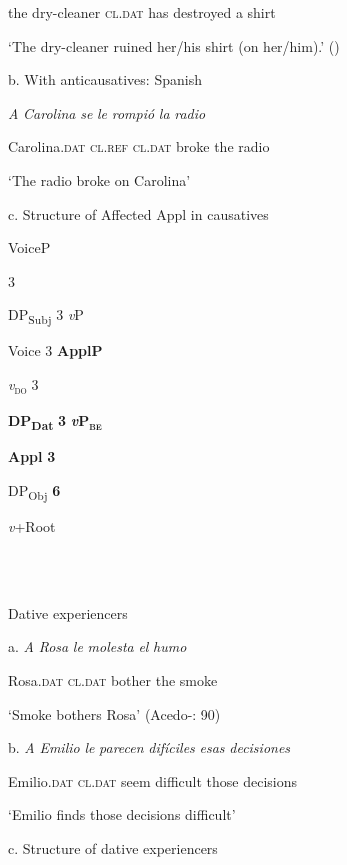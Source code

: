 \documentclass[output=paper,modfonts,nonflat]{langsci/langscibook}
\begin{document}
  the dry-cleaner \textsc{cl.dat} has destroyed a shirt

  ‘The dry-cleaner ruined her/his shirt (on her/him).’  (\citealt{BonehNash2012})    

b. With anticausatives: Spanish 

  \textit{A} \textit{Carolina}     \textit{se}         \textit{le}        \textit{rompió}   \textit{la} \textit{radio} 

Carolina.\textsc{dat} \textsc{cl.ref} \textsc{cl.dat}    broke     the radio 

‘The radio broke on Carolina’

c. Structure of Affected Appl in causatives \citep[113]{Cuervo2003}

                 VoiceP

         3  

      DP\textsubscript{Subj}      3  \textit{v}P

        Voice    3  \textbf{ApplP}

        \textit{v}\textsc{\textsubscript{do}      }   3 

               \textbf{DP\textsubscript{Dat}}    \textbf{3}  \textbf{\textit{v}}\textbf{P\textsc{\textsubscript{be}}}

                                    \textbf{Appl}        \textbf{3} 

                            DP\textsubscript{Obj}     \textbf{6} 

                      \textit{v}+Root    

\ea%
    \label{ex:key:4}
    \gll\\
        \\
    \glt
    \z

             Dative experiencers    

a.   \textit{A} \textit{Rosa}      \textit{le}            \textit{molesta}   \textit{el} \textit{humo}

  Rosa.\textsc{dat}   \textsc{cl.dat}  bother  the smoke

  ‘Smoke bothers Rosa’   (Acedo-\citealt{MatellánMateu2015}: 90)

b.   \textit{A} \textit{Emilio}      \textit{le} \textit{parecen}   \textit{difíciles} \textit{esas} \textit{decisiones}

  Emilio.\textsc{dat}  \textsc{cl.dat} seem   difficult those decisions   

  ‘Emilio finds those decisions difficult’ 

c. Structure of dative experiencers   
\end{document}
